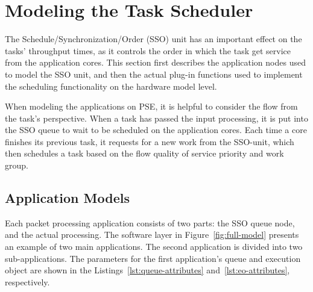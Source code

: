 \section{Modeling the Task Scheduler}
\label{sec:modeling-task-scheduler}

The Schedule/Synchronization/Order (SSO) unit has an important effect on the tasks' throughput times, as it controls the order in which the task get service from the application cores. This section first describes the application nodes used to model the SSO unit, and then the actual plug-in functions used to implement the scheduling functionality on the hardware model level.







When modeling the applications on PSE, it is helpful to consider the flow from the task's perspective. When a task has passed the input processing, it is put into the SSO queue to wait to be scheduled on the application cores. Each time a core finishes its previous task, it requests for a new work from the SSO-unit, which then schedules a task based on the flow quality of service  priority and work group.

\subsection{Application Models}
\label{application-models}

Each packet processing application consists of two parts: the SSO queue node, and the actual processing. The software layer in Figure~\ref{fig:full-model} presents an example of two main applications. The second application is divided into two sub-applications. The parameters for the first application's queue and execution object are shown in the Listings~\ref{lst:queue-attributes} and~\ref{lst:eo-attributes}, respectively.



